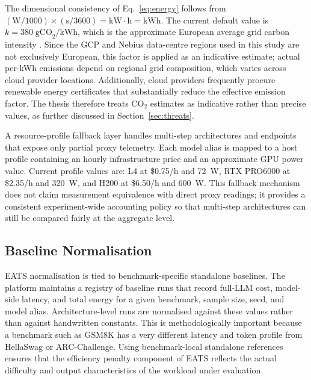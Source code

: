 The dimensional consistency of Eq.~\eqref{eq:energy} follows from $(\text{W}/1000) \times (\text{s}/3600) = \text{kW}\cdot\text{h} = \text{kWh}$. The current default value is $k = 380\;\text{gCO}_2/\text{kWh}$, which is the approximate European average grid carbon intensity \cite{energytoken2025}. Since the GCP and Nebius data-centre regions used in this study are not exclusively European, this factor is applied as an indicative estimate; actual per-kWh emissions depend on regional grid composition, which varies across cloud provider locations. Additionally, cloud providers frequently procure renewable energy certificates that substantially reduce the effective emission factor. The thesis therefore treats CO$_2$ estimates as indicative rather than precise values, as further discussed in Section~\ref{sec:threats}.

A resource-profile fallback layer handles multi-step architectures and endpoints that expose only partial proxy telemetry. Each model alias is mapped to a host profile containing an hourly infrastructure price and an approximate GPU power value. Current profile values are: L4 at \$0.75/h and 72~W, RTX PRO6000 at \$2.35/h and 320~W, and H200 at \$6.50/h and 600~W. This fallback mechanism does not claim measurement equivalence with direct proxy readings; it provides a consistent experiment-wide accounting policy so that multi-step architectures can still be compared fairly at the aggregate level.

\subsection{Baseline Normalisation}
\label{sec:normalisation}

EATS normalisation is tied to benchmark-specific standalone baselines. The platform maintains a registry of baseline runs that record full-LLM cost, model-side latency, and total energy for a given benchmark, sample size, seed, and model alias. Architecture-level runs are normalised against these values rather than against handwritten constants. This is methodologically important because a benchmark such as GSM8K has a very different latency and token profile from HellaSwag or ARC-Challenge. Using benchmark-local standalone references ensures that the efficiency penalty component of EATS reflects the actual difficulty and output characteristics of the workload under evaluation.

